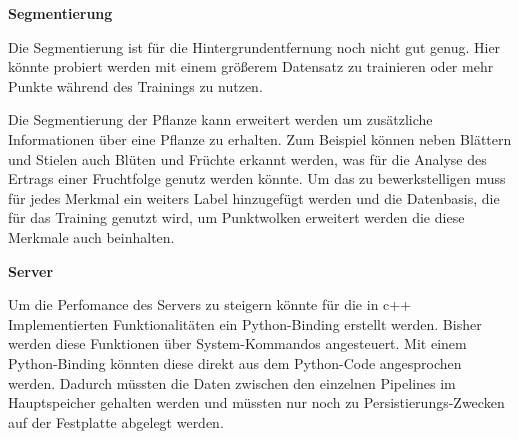 \documentclass[12pt,titlepage, twoside]{article}
\begin{document}
\textbf{Segmentierung}

Die Segmentierung ist für die Hintergrundentfernung noch nicht gut genug. Hier könnte probiert werden mit einem größerem Datensatz zu trainieren oder mehr Punkte während des Trainings zu nutzen.

Die Segmentierung der Pflanze kann erweitert werden um zusätzliche Informationen über eine Pflanze zu erhalten. Zum Beispiel können neben Blättern und Stielen auch Blüten und Früchte erkannt werden, was für die Analyse des Ertrags einer Fruchtfolge genutz werden könnte.
Um das zu bewerkstelligen muss für jedes Merkmal ein weiters Label hinzugefügt werden und die Datenbasis, die für das Training genutzt wird, um Punktwolken erweitert werden die diese Merkmale auch beinhalten.

\textbf{Server}

Um die Perfomance des Servers zu steigern könnte für die in c++ Implementierten Funktionalitäten ein Python-Binding erstellt werden. Bisher werden diese Funktionen über System-Kommandos angesteuert. 
Mit einem Python-Binding könnten diese direkt aus dem Python-Code angesprochen werden. Dadurch müssten die Daten zwischen den einzelnen Pipelines im Hauptspeicher gehalten werden und müssten nur noch zu Persistierungs-Zwecken auf der Festplatte abgelegt werden.



\newpage



\end{document}
